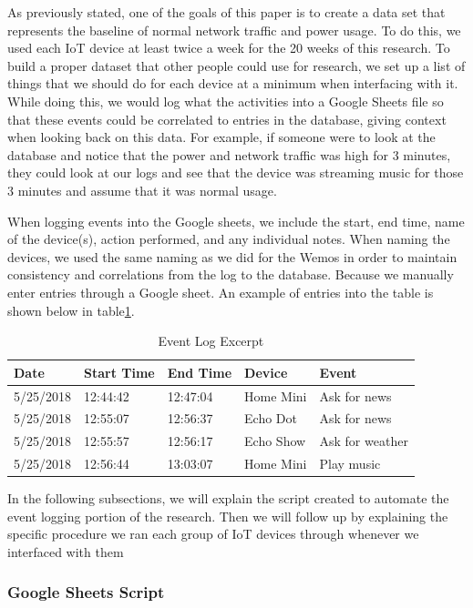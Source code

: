 As previously stated, one of the goals of this paper is to create a data set that represents the baseline of normal network traffic and power usage. To do this, we used each IoT device at least twice a week for the 20 weeks of this research. To build a proper dataset that other people could use for research, we set up a list of things that we should do for each device at a minimum when interfacing with it. While doing this, we would log what the activities into a Google Sheets file so that these events could be correlated to entries in the database, giving context when looking back on this data. For example, if someone were to look at the database and notice that the power and network traffic was high for 3 minutes, they could look at our logs and see that the device was streaming music for those 3 minutes and assume that it was normal usage.

When logging events into the Google sheets, we include the start, end time, name of the device(s), action performed, and any individual notes. When naming the devices, we used the same naming as we did for the Wemos in order to maintain consistency and correlations from the log to the database. Because we manually enter entries through a Google sheet. An example of entries into the table is shown below in table\ref{tab:events}.

\begin{table}[H]
    \centering
    \caption{Event Log Excerpt}
    \begin{tabular}{@{}lllll@{}}
        \toprule
        Date & Start Time & End Time & Device & Event \\ \midrule
        5/25/2018 & 12:44:42 & 12:47:04 & Home Mini & Ask for news \\
        5/25/2018 & 12:55:07 & 12:56:37 & Echo Dot & Ask for news \\
        5/25/2018 & 12:55:57 & 12:56:17 & Echo Show & Ask for weather \\
        5/25/2018 & 12:56:44 & 13:03:07 & Home Mini & Play music \\ \bottomrule
        \end{tabular}
    \label{tab:events}
\end{table}

In the following subsections, we will explain the script created to automate the event logging portion of the research. Then we will follow up by explaining the specific procedure we ran each group of IoT devices through whenever we interfaced with them

\subsubsection{Google Sheets Script}

